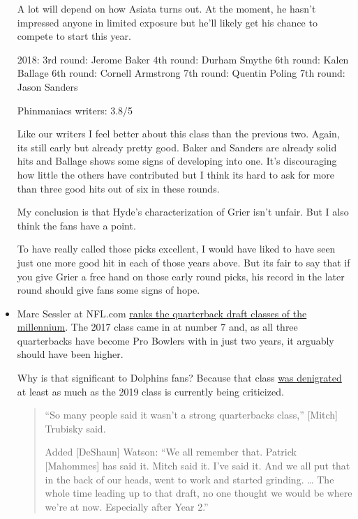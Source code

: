 \begin{itemize}
A lot will depend on how Asiata turns out.  At the moment, he hasn't impressed anyone in limited exposure but he'll likely get his chance to compete to start this year.  

2018:
3rd round:  Jerome Baker
4th round:  Durham Smythe
6th round:  Kalen Ballage
6th round:  Cornell Armstrong
7th round:  Quentin Poling
7th round:  Jason Sanders

Phinmaniacs writers:  3.8/5

Like our writers I feel better about this class than the previous two.  Again, its still early but already pretty good.  Baker and Sanders are already solid hits and Ballage shows some signs of developing into one. It's discouraging how little the others have contributed but I think its hard to ask for more than three good hits out of six in these rounds.

My conclusion is that Hyde's characterization of Grier isn't unfair.  But I also think the fans have a point.  

To have really called those picks excellent, I would have liked to have seen just one more good hit in each of those years above.  But its fair to say that if you give Grier a free hand on those early round picks, his record in the later round should give fans some signs of hope.

\item Marc Sessler at NFL.com \href{http://www.nfl.com/news/story/0ap3000001027184/article/nfl-draft-ranking-every-quarterback-class-of-this-millennium?campaign=Twitter_atn}{ranks the quarterback draft classes of the millennium}.  The 2017 class came in at number 7 and, as all three quarterbacks have become Pro Bowlers with in just two years, it arguably should have been higher.  

  Why is that significant to Dolphins fans?  Because that class \href{https://www.chicagotribune.com/sports/football/bears/ct-spt-bears-pro-bowl-eddie-jackson-mitch-trubisky-patrick-mahomes-20190125-story.html}{was denigrated} at least as much as the 2019 class is currently being criticized.

  \begin{quote}
    “So many people said it wasn’t a strong quarterbacks class,” [Mitch] Trubisky said.

Added [DeShaun] Watson: “We all remember that. Patrick [Mahommes] has said it. Mitch said it. I’ve said it. And we all put that in the back of our heads, went to work and started grinding. … The whole time leading up to that draft, no one thought we would be where we’re at now. Especially after Year 2.”
  \end{quote}



\end{itemize}
